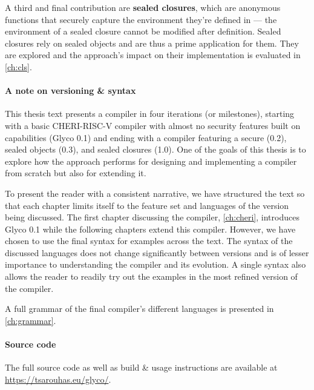 \documentclass[main.tex]{subfiles}
\begin{document}
A third and final contribution are \textbf{sealed closures}, which are anonymous functions that securely capture the environment they're defined in — the environment of a sealed closure cannot be modified after definition. Sealed closures rely on sealed objects and are thus a prime application for them. They are explored and the  approach's impact on their implementation is evaluated in \cref{ch:cls}.

\paragraph{A note on versioning \& syntax} This thesis text presents a compiler in four iterations (or milestones), starting with a basic CHERI-RISC-V compiler with almost no security features built on capabilities (Glyco 0.1) and ending with a compiler featuring a secure  (0.2), sealed objects (0.3), and sealed closures (1.0). One of the goals of this thesis is to explore how the  approach performs for designing and implementing a compiler from scratch but also for extending it.

To present the reader with a consistent narrative, we have structured the text so that each chapter limits itself to the feature set and languages of the version being discussed. The first chapter discussing the compiler, \cref{ch:cheri}, introduces Glyco 0.1 while the following chapters extend this compiler. However, we have chosen to use the final syntax for examples across the text. The syntax of the discussed languages does not change significantly between versions and is of lesser importance to understanding the compiler and its evolution. A single syntax also allows the reader to readily try out the examples in the most refined version of the compiler.

A full grammar of the final compiler's different languages is presented in \cref{ch:grammar}.

\paragraph{Source code} The full source code as well as build \& usage instructions are available at \url{https://tsarouhas.eu/glyco/}.

\biblio{}
\onlyinsubfile{\glsaddall\printglossaries}
\end{document}
